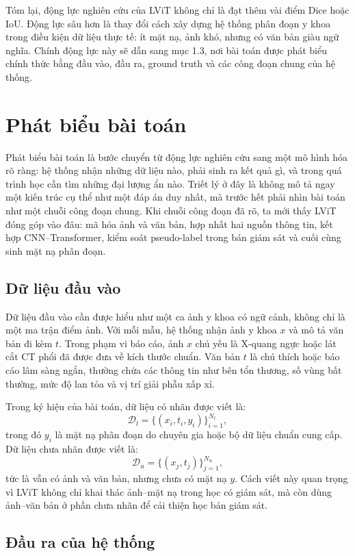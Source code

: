 Tóm lại, động lực nghiên cứu của LViT không chỉ là đạt thêm vài điểm Dice hoặc IoU. Động lực sâu hơn là thay đổi cách xây dựng hệ thống phân đoạn y khoa trong điều kiện dữ liệu thực tế: ít mặt nạ, ảnh khó, nhưng có văn bản giàu ngữ nghĩa. Chính động lực này sẽ dẫn sang mục 1.3, nơi bài toán được phát biểu chính thức bằng đầu vào, đầu ra, ground truth và các công đoạn chung của hệ thống.

\section{Phát biểu bài toán}

Phát biểu bài toán là bước chuyển từ động lực nghiên cứu sang một mô hình hóa rõ ràng: hệ thống nhận những dữ liệu nào, phải sinh ra kết quả gì, và trong quá trình học cần tìm những đại lượng ẩn nào. Triết lý ở đây là không mô tả ngay một kiến trúc cụ thể như một đáp án duy nhất, mà trước hết phải nhìn bài toán như một chuỗi công đoạn chung. Khi chuỗi công đoạn đã rõ, ta mới thấy LViT đóng góp vào đâu: mã hóa ảnh và văn bản, hợp nhất hai nguồn thông tin, kết hợp CNN--Transformer, kiểm soát pseudo-label trong bán giám sát và cuối cùng sinh mặt nạ phân đoạn.

\subsection{Dữ liệu đầu vào}

Dữ liệu đầu vào cần được hiểu như một ca ảnh y khoa có ngữ cảnh, không chỉ là một ma trận điểm ảnh. Với mỗi mẫu, hệ thống nhận ảnh y khoa \(x\) và mô tả văn bản đi kèm \(t\). Trong phạm vi báo cáo, ảnh \(x\) chủ yếu là X-quang ngực hoặc lát cắt CT phổi đã được đưa về kích thước chuẩn. Văn bản \(t\) là chú thích hoặc báo cáo lâm sàng ngắn, thường chứa các thông tin như bên tổn thương, số vùng bất thường, mức độ lan tỏa và vị trí giải phẫu xấp xỉ.

Trong ký hiệu của bài toán, dữ liệu có nhãn được viết là:
\[
\mathcal{D}_l=\{(x_i,t_i,y_i)\}_{i=1}^{N_l},
\]
trong đó \(y_i\) là mặt nạ phân đoạn do chuyên gia hoặc bộ dữ liệu chuẩn cung cấp. Dữ liệu chưa nhãn được viết là:
\[
\mathcal{D}_u=\{(x_j,t_j)\}_{j=1}^{N_u},
\]
tức là vẫn có ảnh và văn bản, nhưng chưa có mặt nạ \(y\). Cách viết này quan trọng vì LViT không chỉ khai thác ảnh--mặt nạ trong học có giám sát, mà còn dùng ảnh--văn bản ở phần chưa nhãn để cải thiện học bán giám sát.

\subsection{Đầu ra của hệ thống}


